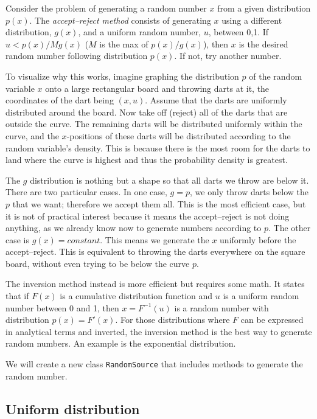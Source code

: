 \documentclass[justified,sixbynine]{tufte-book}
\def\ft{\small\tt}
\theoremstyle{plain}%
\theoremstyle{definition}
\theoremstyle{remark}
\begin{document}
\begin{fullwidth}
Consider the problem of generating a random number $x$ from a given distribution $p(x)$. The {\it accept--reject method} consists of generating $x$ using a different distribution, $g(x)$, and a uniform random number, $u$, between 0,1. If $u<p(x)/Mg(x)$ ($M$ is the max of $p(x)/g(x)$), then $x$ is the desired random number following distribution $p(x)$. If not, try another number.

To visualize why this works, imagine graphing the distribution $p$ of the random variable $x$ onto a large rectangular board and throwing darts at it, the coordinates of the dart being $(x,u)$. Assume that the darts are uniformly distributed around the board. Now take off (reject) all of the darts that are outside the curve. The remaining darts will be distributed uniformly within the curve, and the $x$-positions of these darts will be distributed according to the random variable's density. This is because there is the most room for the darts to land where the curve is highest and thus the probability density is greatest.

The $g$ distribution is nothing but a shape so that all darts we throw are below it. There are two particular cases. In one case, $g=p$, we only throw darts below the $p$ that we want; therefore we accept them all. This is the most efficient case, but it is not of practical interest because it means the accept--reject is not doing anything, as we already know now to generate numbers according to $p$. The other case is $g(x) = constant$. This means we generate the $x$ uniformly before the accept--reject. This is equivalent to throwing the darts everywhere on the square board, without even trying to be below the curve $p$.

The inversion method instead is more efficient but requires some math. It states that if $F(x)$ is a cumulative distribution function and $u$ is a uniform random number between 0 and 1, then $x = F^{-1}(u)$ is a random number with distribution $p(x)=F'(x)$. For those distributions where $F$ can be expressed in analytical terms and inverted, the inversion method is the best way to generate random numbers. An example is the exponential distribution.

We will create a new class {\ft RandomSource} that includes methods to generate the random number.

\goodbreak\subsection{Uniform distribution}


\end{fullwidth}
\end{document}
